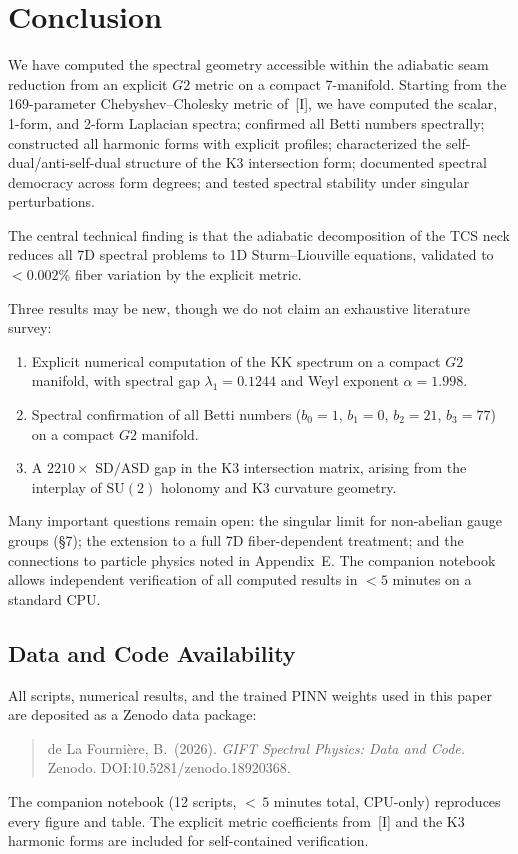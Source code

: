 \documentclass[11pt,a4paper]{article}
\newcommand{\Gtwo}{\mathrm{G}_2}
\newcommand{\SU}{\mathrm{SU}}
\newcommand{\SD}{\mathrm{SD}}
\newcommand{\ASD}{\mathrm{ASD}}
\theoremstyle{remark}
\def\Gtwo{G2}%
\begin{document}
\section{Conclusion}

We have computed the spectral geometry accessible within the adiabatic seam
reduction from an explicit $\Gtwo$ metric on a compact 7-manifold. Starting from the
169-parameter Chebyshev--Cholesky metric of~[I], we have computed the scalar, 1-form,
and 2-form Laplacian spectra; confirmed all Betti numbers spectrally; constructed
all harmonic forms with explicit profiles; characterized the self-dual/anti-self-dual
structure of the K3 intersection form; documented spectral democracy across form
degrees; and tested spectral stability under singular perturbations.

The central technical finding is that the adiabatic decomposition of the TCS neck
reduces all 7D spectral problems to 1D Sturm--Liouville equations, validated to
$< 0.002\%$ fiber variation by the explicit metric.

Three results may be new, though we do not claim an exhaustive literature survey:

\begin{enumerate}
\item Explicit numerical computation of the KK spectrum on a compact $\Gtwo$ manifold,
   with spectral gap $\lambda_1 = 0.1244$ and Weyl exponent $\alpha = 1.998$.
\item Spectral confirmation of all Betti numbers ($b_0 = 1$, $b_1 = 0$, $b_2 = 21$,
   $b_3 = 77$) on a compact $\Gtwo$ manifold.
\item A $2210\times$ $\SD/\ASD$ gap in the K3 intersection matrix, arising from the interplay
   of $\SU(2)$ holonomy and K3 curvature geometry.
\end{enumerate}

Many important questions remain open: the singular limit for non-abelian gauge
groups (\S7); the extension to a full 7D fiber-dependent treatment; and the connections to particle physics noted in Appendix~E.
The companion notebook allows independent verification of all computed results in
$< 5$ minutes on a standard CPU.

\subsection*{Data and Code Availability}

All scripts, numerical results, and the trained PINN weights used in this paper
are deposited as a Zenodo data package:
\begin{quote}
de La Fourni\`ere, B.\ (2026). \emph{GIFT Spectral Physics: Data and Code.}
Zenodo. DOI:\@ 10.5281/\allowbreak zenodo.18920368.
\end{quote}
The companion notebook (12 scripts, ${<}\,5$ minutes total, CPU-only) reproduces
every figure and table. The explicit metric coefficients from~[I] and the
K3 harmonic forms are included for self-contained verification.
\end{document}
